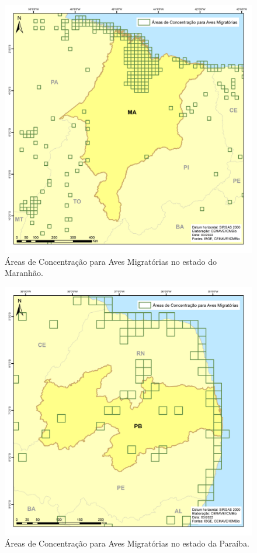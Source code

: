 \documentclass[
  oneside]{scrbook}
\begin{document}
\begin{figure}[H]

{\centering \includegraphics[width=0.75\linewidth]{imagens/cap07/Figura_7.14_MA} 

}

\caption{Áreas de Concentração para Aves Migratórias no estado do Maranhão.}\label{fig:34}
\end{figure}

\begin{figure}[H]

{\centering \includegraphics[width=0.75\linewidth]{imagens/cap07/Figura_7.15_PB} 

}

\caption{Áreas de Concentração para Aves Migratórias no estado da Paraíba.}\label{fig:35}
\end{figure}
\end{document}
